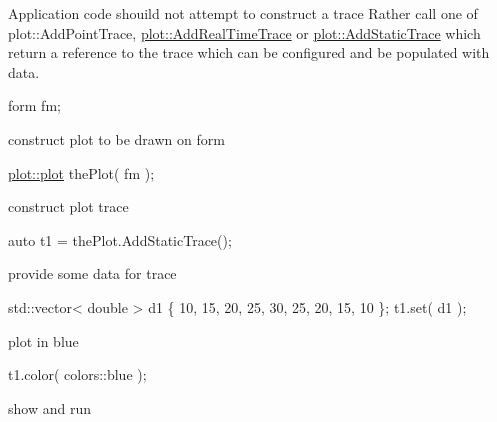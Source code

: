 Application code shouild not attempt to construct a trace Rather call one of plot\-::\-Add\-Point\-Trace, \hyperlink{classnana_1_1plot_1_1plot_a4cc1af8e943cecf919b2662c4d71c20c}{plot\-::\-Add\-Real\-Time\-Trace} or \hyperlink{classnana_1_1plot_1_1plot_ac537d6bd9cb05cd1702d71f9b721ddde}{plot\-::\-Add\-Static\-Trace} which return a reference to the trace which can be configured and be populated with data.


\begin{DoxyPre}
    form fm;\end{DoxyPre}



\begin{DoxyPre}     construct plot to be drawn on form\end{DoxyPre}



\begin{DoxyPre}    \hyperlink{classnana_1_1plot_1_1plot}{plot::plot} thePlot( fm );\end{DoxyPre}



\begin{DoxyPre}     construct plot trace\end{DoxyPre}



\begin{DoxyPre}    auto t1 = thePlot.AddStaticTrace();\end{DoxyPre}



\begin{DoxyPre}     provide some data for  trace\end{DoxyPre}



\begin{DoxyPre}    std::vector< double > d1 \{ 10, 15, 20, 25, 30, 25, 20, 15, 10 \};
    t1.set( d1 );\end{DoxyPre}



\begin{DoxyPre}     plot in blue\end{DoxyPre}



\begin{DoxyPre}    t1.color( colors::blue );\end{DoxyPre}



\begin{DoxyPre}     show and run\end{DoxyPre}



